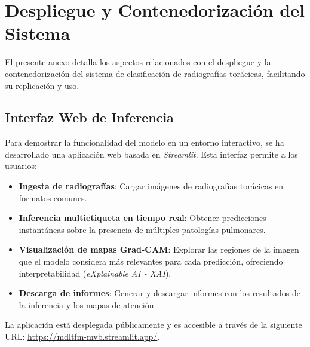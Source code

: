 %
\chapter{Despliegue y Contenedorización del Sistema}
\label{sec::anexo_despliegue}

El presente anexo detalla los aspectos relacionados con el despliegue y la contenedorización del sistema de clasificación de radiografías torácicas, facilitando su replicación y uso.

\section{Interfaz Web de Inferencia}
Para demostrar la funcionalidad del modelo en un entorno interactivo, se ha desarrollado una aplicación web basada en \textit{Streamlit}. Esta interfaz permite a los usuarios:
\begin{itemize}
    \item \textbf{Ingesta de radiografías}: Cargar imágenes de radiografías torácicas en formatos comunes.
    \item \textbf{Inferencia multietiqueta en tiempo real}: Obtener predicciones instantáneas sobre la presencia de múltiples patologías pulmonares.
    \item \textbf{Visualización de mapas Grad-CAM}: Explorar las regiones de la imagen que el modelo considera más relevantes para cada predicción, ofreciendo interpretabilidad (\textit{eXplainable AI - XAI}).
    \item \textbf{Descarga de informes}: Generar y descargar informes con los resultados de la inferencia y los mapas de atención.
\end{itemize}
La aplicación está desplegada públicamente y es accesible a través de la siguiente URL: \url{https://mdltfm-mvb.streamlit.app/}.

